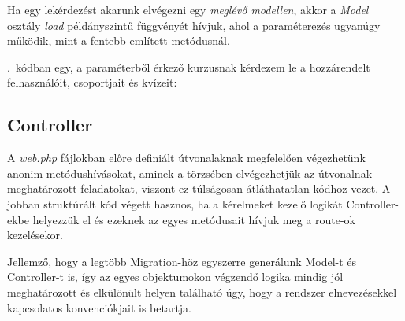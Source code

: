 \documentclass[
]{thesis-ekf}
\theoremstyle{definition}
\theoremstyle{remark}
\begin{document}
                    Ha egy lekérdezést akarunk elvégezni egy \emph{meglévő modellen}, akkor a \emph{Model} osztály \emph{load} példányszintű függvényét hívjuk, ahol a paraméterezés ugyanúgy működik, mint a fentebb említett metódusnál.

                    \Az{\ref{LazyEagerLoadingExample}}.~kódban egy, a paraméterből érkező kurzusnak kérdezem le a hozzárendelt felhasználóit, csoportjait és kvízeit:
                    
                    
                \subsection{Controller}
                    A \emph{web.php} fájlokban előre definiált útvonalaknak megfelelően végezhetünk anonim metódushívásokat, aminek a törzsében elvégezhetjük az útvonalnak meghatározott feladatokat, viszont ez túlságosan átláthatatlan kódhoz vezet. A jobban struktúrált kód végett hasznos, ha a kérelmeket kezelő logikát Controller-ekbe\cite{Laravel-Controllers} helyezzük el és ezeknek az egyes metódusait hívjuk meg a route-ok kezelésekor.

                    Jellemző, hogy a legtöbb Migration-höz egyszerre generálunk Model-t és Controller-t is, így az egyes objektumokon végzendő logika mindig jól meghatározott és elkülönült helyen található úgy, hogy a rendszer elnevezésekkel kapcsolatos konvenciókjait is betartja.
\end{document}
